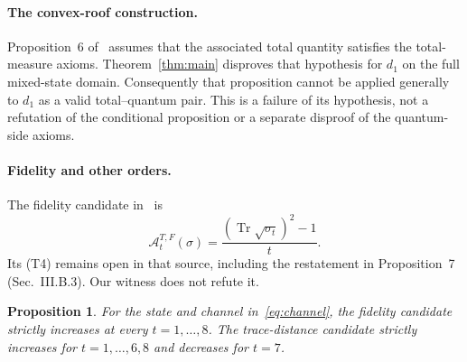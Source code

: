 \documentclass[11pt]{article}
\newcommand{\Tr}{\operatorname{Tr}}
\newcommand{\A}{\mathcal{A}}
\newtheorem{proposition}{Proposition}
\begin{document}
\paragraph{The convex-roof construction.}
Proposition~6 of~\cite[Sec.~III.B.2]{DLMS} assumes that the associated total
quantity satisfies the total-measure axioms. Theorem~\ref{thm:main} disproves
that hypothesis for $d_1$ on the full mixed-state domain. Consequently that
proposition cannot be applied generally to $d_1$ as a valid total--quantum
pair. This is a failure of its hypothesis, not a refutation of the conditional
proposition or a separate disproof of the quantum-side axioms.

\paragraph{Fidelity and other orders.}
The fidelity candidate in~\cite[Sec.~III.A.3, Eq.~(26)]{DLMS} is
\[
 \A_t^{T,F}(\sigma)=\frac{(\Tr\sqrt{\sigma_t})^2-1}{t}.
\]
Its (T4) remains open in that source, including the restatement in
Proposition~7 (Sec.~III.B.3). Our witness does not refute it.
\begin{proposition}
For the state and channel in~\eqref{eq:channel}, the fidelity candidate
strictly increases at every $t=1,\ldots,8$. The trace-distance candidate
strictly increases for $t=1,\ldots,6,8$ and decreases for $t=7$.
\end{proposition}
\end{document}
